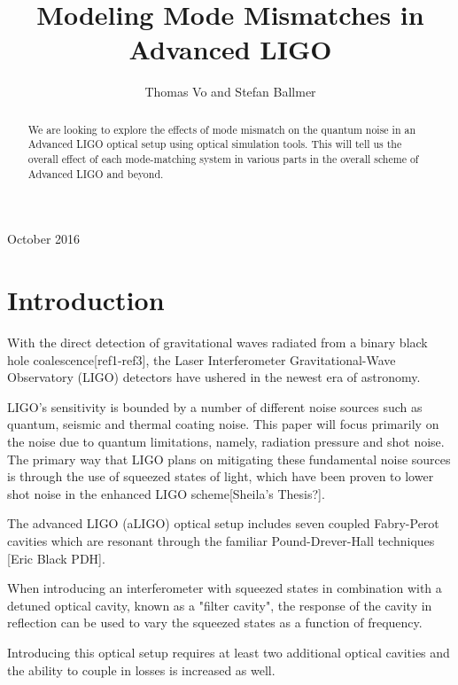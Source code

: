 \documentclass[12pt]{iopart}
\begin{document}
\title[]{Modeling Mode Mismatches in Advanced LIGO}

\author{Thomas Vo and Stefan Ballmer}

\address{Syracuse University, Department of Physics, Syracuse University 13244}
\vspace{10pt}
\begin{indented}
\item[]October 2016
\end{indented}



\begin{abstract}
We are looking to explore the effects of mode mismatch on the quantum noise in an Advanced LIGO optical setup using optical simulation tools.  This will tell us the overall effect of each mode-matching system in various parts in the overall scheme of Advanced LIGO and beyond.
\end{abstract}

\section{Introduction}
With the direct detection of gravitational waves radiated from a binary black hole coalescence[ref1-ref3], the Laser Interferometer Gravitational-Wave Observatory (LIGO) detectors have ushered in the newest era of astronomy. 

LIGO's sensitivity is bounded by a number of different noise sources such as quantum, seismic and thermal coating noise.  This paper will focus primarily on the noise due to quantum limitations, namely, radiation pressure and shot noise.  The primary way that LIGO plans on mitigating these fundamental noise sources is through the use of squeezed states of light, which have been proven to lower shot noise in the enhanced LIGO scheme[Sheila's Thesis?].  

The advanced LIGO (aLIGO) optical setup includes seven coupled Fabry-Perot cavities which are resonant through the familiar Pound-Drever-Hall techniques [Eric Black PDH].  

When introducing an interferometer with squeezed states in combination with a detuned optical cavity, known as a "filter cavity", the response of the cavity in reflection can be used to vary the squeezed states as a function of frequency. 

Introducing this optical setup requires at least two additional optical cavities and the ability to couple in losses is increased as well.
\end{document}
